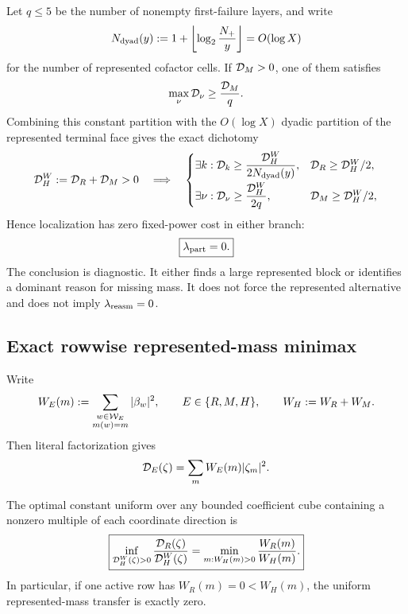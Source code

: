 Let \(q\le5\) be the number of nonempty first-failure layers, and write
\begin{equation}
 N_{\rm dyad}(y)
 :=1+\left\lfloor\log_2\frac{N_+}{y}\right\rfloor
 =O(\log X)
 \label{eq:tpc60-dyadic-block-count}
\end{equation}
for the number of represented cofactor cells.  If
\(\mathcal D_M>0\), one of them satisfies
\begin{equation}
 \max_\nu\mathcal D_\nu\ge\frac{\mathcal D_M}{q}.
 \label{eq:tpc60-failure-pigeonhole}
\end{equation}
Combining this constant partition with the \(O(\log X)\) dyadic partition
of the represented terminal face gives the exact dichotomy
\begin{equation}
 \mathcal D_H^W:=\mathcal D_R+\mathcal D_M>0
 \quad\Longrightarrow\quad
 \begin{cases}
  \exists k:\displaystyle
  \mathcal D_k\ge\dfrac{\mathcal D_H^W}{2N_{\rm dyad}(y)},
  &\mathcal D_R\ge\mathcal D_H^W/2,\\[8pt]
  \exists\nu:\displaystyle
  \mathcal D_\nu\ge\dfrac{\mathcal D_H^W}{2q},
  &\mathcal D_M\ge\mathcal D_H^W/2,
 \end{cases}
 \label{eq:tpc60-represented-missing-dichotomy}
\end{equation}
Hence localization has zero fixed-power cost in
either branch:
\begin{equation}
 \boxed{\lambda_{\rm part}=0.}
 \label{eq:tpc60-zero-partition-cost}
\end{equation}
The conclusion is diagnostic.  It either finds a large represented block
or identifies a dominant reason for missing mass.  It does not force the
represented alternative and does not imply
\(\lambda_{\rm reasm}=0\).

\subsection{Exact rowwise represented-mass minimax}

Write
\begin{equation}
 W_E(m):=\sum_{\substack{w\in\mathcal W_E\\m(w)=m}}|\beta_w|^2,
 \qquad E\in\{R,M,H\},
 \qquad W_H:=W_R+W_M.
 \label{eq:tpc60-row-weights}
\end{equation}
Then literal factorization gives
\begin{equation}
 \mathcal D_E(\zeta)=\sum_mW_E(m)|\zeta_m|^2.
 \label{eq:tpc60-row-diagonal-form}
\end{equation}

\begin{proposition}
\label{prop:tpc60-rowwise-represented-minimax}
The optimal constant uniform over any bounded coefficient cube containing
a nonzero multiple of each coordinate direction is
\begin{equation}
 \boxed{
 \inf_{\mathcal D_H^W(\zeta)>0}
 \frac{\mathcal D_R(\zeta)}{\mathcal D_H^W(\zeta)}
 =\min_{m:W_H(m)>0}\frac{W_R(m)}{W_H(m)}.}
 \label{eq:tpc60-rowwise-represented-minimax}
\end{equation}
In particular, if one active row has
\(W_R(m)=0<W_H(m)\), the uniform represented-mass transfer is exactly zero.
\end{proposition}

